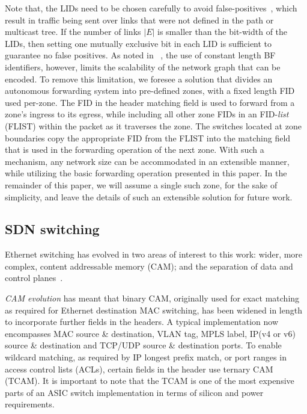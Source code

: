 \documentclass[conference]{IEEEtran}
\begin{document}
Note that, the LIDs need to be chosen carefully to avoid false-positives~\cite{Jokela09}, which result in traffic being sent over links that were not defined in the path or multicast tree. If the number of links $|E|$ is smaller than the bit-width of the LIDs, then setting one mutually exclusive bit in each LID is sufficient to guarantee no false positives. As noted in ~\cite{Zahemszky2010}, the use of constant length BF identifiers, however, limits the scalability of the network graph that can be encoded. To remove this limitation, we foresee a solution that divides an autonomous forwarding system into pre-defined zones, with a fixed length FID used per-zone. The FID in the header matching field is used to forward from a zone's ingress to its egress, while including all other zone FIDs in an FID-\emph{list} (FLIST) within the packet as it traverses the zone. The switches located at zone boundaries copy the appropriate FID from the FLIST into the matching field that is used in the forwarding operation of the next zone. With such a mechanism, any network size can be accommodated in an extensible manner, while utilizing the basic forwarding operation presented in this paper. In the remainder of this paper, we will assume a single such zone, for the sake of simplicity, and leave the details of such an extensible solution for future work.

\subsection{SDN switching}
\label{sec:sdn-switching}

Ethernet switching has evolved in two areas of interest to this work: wider, more complex, content addressable memory (CAM); and the separation of data and control planes~\cite{Kreutz2015}.

\emph{CAM evolution} has meant that binary CAM, originally used for exact matching as required for Ethernet destination MAC switching, has been widened in length to incorporate further fields in the headers. A typical implementation now encompasses MAC source \& destination, VLAN tag, MPLS label, IP(v4 or v6) source \& destination and TCP/UDP source \& destination ports. To enable wildcard matching, as required by IP longest prefix match, or port ranges in access control lists (ACLs), certain fields in the header use ternary CAM (TCAM). It is important to note that the TCAM is one of the most expensive parts of an ASIC switch implementation in terms of silicon and power requirements.
\end{document}
